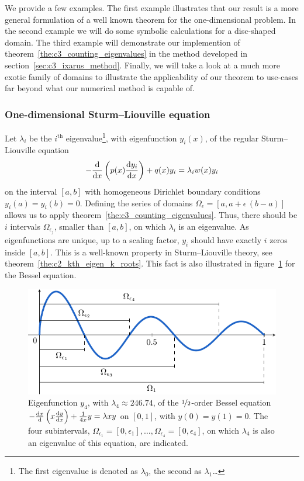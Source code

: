 We provide a few examples. The first example illustrates that our result is a more general formulation of a well known theorem for the one-dimensional problem. In the second example we will do some symbolic calculations for a disc-shaped domain. The third example will demonstrate our implemention of theorem~\ref{the:c3_counting_eigenvalues} in the method developed in section~\ref{sec:c3_ixarus_method}. Finally, we will take a look at a much more exotic family of domains to illustrate the applicability of our theorem to use-cases far beyond what our numerical method is capable of.

\subsubsection{One-dimensional Sturm--Liouville equation}

Let $\lambda_i$ be the $i^{\text{th}}$ eigenvalue\footnote{The first eigenvalue is denoted as $\lambda_0$, the second as $\lambda_1$\dots}, with eigenfunction $y_i(x)$, of the regular Sturm--Liouville equation
$$
  -\dv{x} \left( p(x) \dv{y_i}{x} \right) + q(x) y_i = \lambda_i w(x) y_i
$$
on the interval $[a, b]$ with homogeneous Dirichlet boundary conditions $y_i(a) = y_i(b) = 0$. Defining the series of domains $\Omega_\epsilon = [a, a + \epsilon\,(b-a)]$ allows us to apply theorem~\ref{the:c3_counting_eigenvalues}. Thus, there should be $i$ intervals $\Omega_{\epsilon_j}$, smaller than $[a, b]$, on which $\lambda_i$ is an eigenvalue. As eigenfunctions are unique, up to a scaling factor, $y_i$ should have exactly $i$ zeros inside $[a, b]$. This is a well-known property in Sturm--Liouville theory, see theorem~\ref{the:c2_kth_eigen_k_roots}. This fact is also illustrated in figure~\ref{fig:c3_counting_sturm_liouville} for the Bessel equation.

\begin{figure}
  \begin{center}
    \includegraphics[width=.9\textwidth]{img/chapter3/counting/sturm-liouville.pdf}
    \caption{Eigenfunction $y_4$, with $\lambda_4 \approx 246.74$, of the $\nicefrac{1}{2}$-order Bessel equation~\cite{titchmarsh_eigenfunction_1962} $-\dv{x}{} \left( x \dv{y}{x} \right) + \frac{1}{4x} y = \lambda x y $ on $[0, 1]$, with $y(0) = y(1) = 0$. The four subintervals, $\Omega_{\epsilon_1} = [0, \epsilon_1],\dots, \Omega_{\epsilon_4} = [0, \epsilon_4]$, on which $\lambda_4$ is also an eigenvalue of this equation, are indicated.}\label{fig:c3_counting_sturm_liouville}
  \end{center}
\end{figure}

